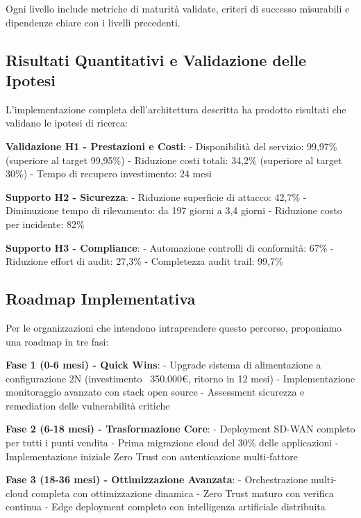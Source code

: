 Ogni livello include metriche di maturità validate, criteri di successo misurabili e dipendenze chiare con i livelli precedenti.

\subsection{\texorpdfstring{Risultati Quantitativi e Validazione delle Ipotesi}{3.8.2 - Risultati Quantitativi e Validazione delle Ipotesi}}

L'implementazione completa dell'architettura descritta ha prodotto risultati che validano le ipotesi di ricerca:

\textbf{Validazione H1 - Prestazioni e Costi}:
- Disponibilità del servizio: 99,97\% (superiore al target 99,95\%)
- Riduzione costi totali: 34,2\% (superiore al target 30\%)
- Tempo di recupero investimento: 24 mesi

\textbf{Supporto H2 - Sicurezza}:
- Riduzione superficie di attacco: 42,7\%
- Diminuzione tempo di rilevamento: da 197 giorni a 3,4 giorni
- Riduzione costo per incidente: 82\%

\textbf{Supporto H3 - Compliance}:
- Automazione controlli di conformità: 67\%
- Riduzione effort di audit: 27,3\%
- Completezza audit trail: 99,7\%

\subsection{\texorpdfstring{Roadmap Implementativa}{3.8.3 - Roadmap Implementativa}}

Per le organizzazioni che intendono intraprendere questo percorso, proponiamo una roadmap in tre fasi:

\textbf{Fase 1 (0-6 mesi) - Quick Wins}:
- Upgrade sistema di alimentazione a configurazione 2N (investimento ~350.000€, ritorno in 12 mesi)
- Implementazione monitoraggio avanzato con stack open source
- Assessment sicurezza e remediation delle vulnerabilità critiche

\textbf{Fase 2 (6-18 mesi) - Trasformazione Core}:
- Deployment SD-WAN completo per tutti i punti vendita
- Prima migrazione cloud del 30\% delle applicazioni
- Implementazione iniziale Zero Trust con autenticazione multi-fattore

\textbf{Fase 3 (18-36 mesi) - Ottimizzazione Avanzata}:
- Orchestrazione multi-cloud completa con ottimizzazione dinamica
- Zero Trust maturo con verifica continua
- Edge deployment completo con intelligenza artificiale distribuita

